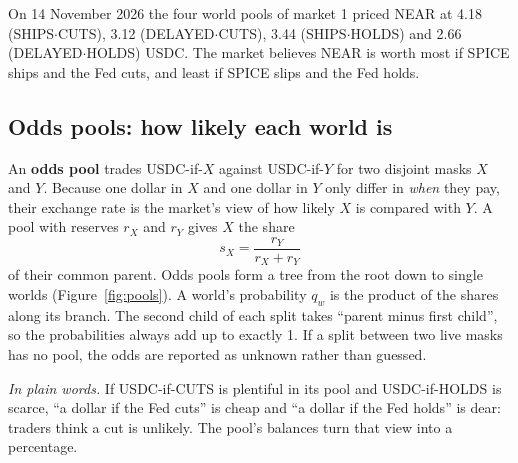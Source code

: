 \documentclass[11pt,a4paper]{article}
\newcommand{\wSC}{\textsf{SHIPS$\cdot$CUTS}}
\newcommand{\wDC}{\textsf{DELAYED$\cdot$CUTS}}
\newcommand{\wSH}{\textsf{SHIPS$\cdot$HOLDS}}
\newcommand{\wDH}{\textsf{DELAYED$\cdot$HOLDS}}
\newcommand{\inwords}[1]{\par\noindent\colorbox{note}{\parbox{\dimexpr\linewidth-2\fboxsep}{\small\textit{In plain words.} #1}}\par}
\begin{document}
On 14 November 2026 the four world pools of market 1 priced NEAR at 4.18 (\wSC), 3.12 (\wDC), 3.44 (\wSH) and
2.66 (\wDH) USDC. The market believes NEAR is worth most if SPICE ships and the Fed cuts, and least if SPICE slips
and the Fed holds.

\subsection{Odds pools: how likely each world is}

An \textbf{odds pool} trades USDC-if-$X$ against USDC-if-$Y$ for two disjoint masks $X$ and $Y$. Because one dollar
in $X$ and one dollar in $Y$ only differ in \emph{when} they pay, their exchange rate is the market's view of how
likely $X$ is compared with $Y$. A pool with reserves $r_X$ and $r_Y$ gives $X$ the share
\begin{equation}
  s_X = \frac{r_Y}{r_X + r_Y}
  \label{eq:share}
\end{equation}
of their common parent. Odds pools form a tree from the root down to single worlds
(Figure~\ref{fig:pools}). A world's probability $q_w$ is the product of the shares along its branch. The second
child of each split takes ``parent minus first child'', so the probabilities always add up to exactly 1. If a split
between two live masks has no pool, the odds are reported as unknown rather than guessed.
\inwords{If USDC-if-CUTS is plentiful in its pool and USDC-if-HOLDS is scarce, ``a dollar if the Fed cuts'' is
cheap and ``a dollar if the Fed holds'' is dear: traders think a cut is unlikely. The pool's balances turn that view
into a percentage.}
\end{document}
